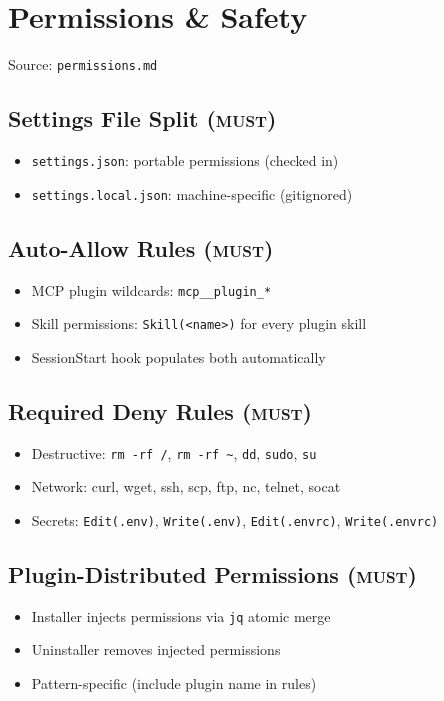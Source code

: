 \documentclass[a4paper,10pt]{article}
\newcommand{\must}{\textsc{must}}
\begin{document}
\section{Permissions \& Safety}
\label{sec:permissions}
Source: \texttt{permissions.md}

\subsection{Settings File Split (\must)}
\begin{itemize}
  \item \texttt{settings.json}: portable permissions (checked in)
  \item \texttt{settings.local.json}: machine-specific (gitignored)
\end{itemize}

\subsection{Auto-Allow Rules (\must)}
\begin{itemize}
  \item MCP plugin wildcards: \texttt{mcp\_\_plugin\_*}
  \item Skill permissions: \texttt{Skill(<name>)} for every plugin skill
  \item SessionStart hook populates both automatically
\end{itemize}

\subsection{Required Deny Rules (\must)}
\begin{itemize}
  \item Destructive: \texttt{rm -rf /}, \texttt{rm -rf \textasciitilde}, \texttt{dd}, \texttt{sudo}, \texttt{su}
  \item Network: curl, wget, ssh, scp, ftp, nc, telnet, socat
  \item Secrets: \texttt{Edit(.env)}, \texttt{Write(.env)}, \texttt{Edit(.envrc)}, \texttt{Write(.envrc)}
\end{itemize}

\subsection{Plugin-Distributed Permissions (\must)}
\begin{itemize}
  \item Installer injects permissions via \texttt{jq} atomic merge
  \item Uninstaller removes injected permissions
  \item Pattern-specific (include plugin name in rules)
\end{itemize}
\end{document}
